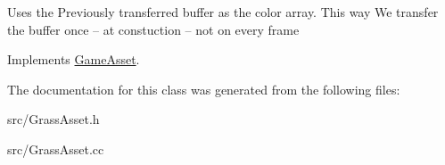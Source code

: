 Uses the Previously transferred buffer as the color array. This way We transfer the buffer once -- at constuction -- not on every frame

Implements \hyperlink{class_game_asset}{Game\+Asset}.



The documentation for this class was generated from the following files\+:\begin{DoxyCompactItemize}
\item 
src/Grass\+Asset.\+h\item 
src/Grass\+Asset.\+cc\end{DoxyCompactItemize}
